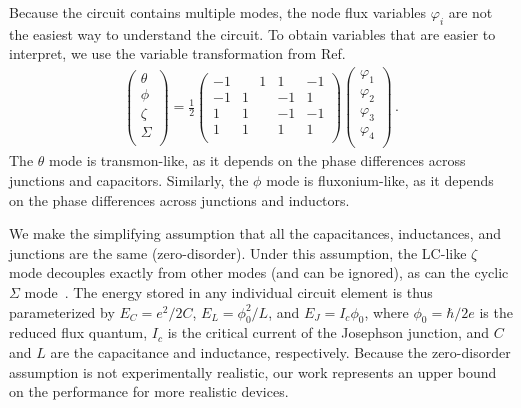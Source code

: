 Because the \zps circuit contains multiple modes, the node flux variables $\varphi_i$ are not the easiest way to understand the circuit.
To obtain variables that are easier to interpret, we use the variable transformation from Ref.~\cite{Dempster2014understanding}
\begin{align}\label{zp:eq:zp_transform}
\left(\begin{array}{c}
{\theta} \\
{\phi} \\
{\zeta} \\
{\Sigma} \\
\end{array}\right)=\frac{1}{2}\left(\begin{array}{rrrr}
-1 & \phantom{-}1 & 1  & -1 \\
-1 & 1 & -1  & 1 \\
1 & 1 & -1  & -1 \\
1 & 1 & 1  & 1 \\
\end{array}\right)\left(\begin{array}{c}
\varphi_1 \\
\varphi_2 \\
\varphi_3 \\
\varphi_4 \\
\end{array}\right) \,.
\end{align}
The $\theta$ mode is transmon-like, as it depends on the phase differences across junctions and capacitors.
Similarly, the $\phi$ mode is fluxonium-like, as it depends on the phase differences across junctions and inductors.

We make the simplifying assumption that all the capacitances, inductances, and junctions are the same (zero-disorder).
Under this assumption, the LC-like $\zeta$ mode decouples exactly from other modes (and can be ignored), as can the cyclic $\Sigma$ mode~\cite{taylor2005classical}.
The energy stored in any individual circuit element is thus parameterized by $E_C = e^2/2C$, $E_L = \phi_0^2/ L$, and $E_J = I_c \phi_0$, where $\phi_0 = \hbar /2e$ is the reduced flux quantum, $I_c$ is the critical current of the Josephson junction, and $C$ and $L$ are the capacitance and inductance, respectively.
Because the zero-disorder assumption is not experimentally realistic, our work represents an upper bound on the performance for more realistic devices.

